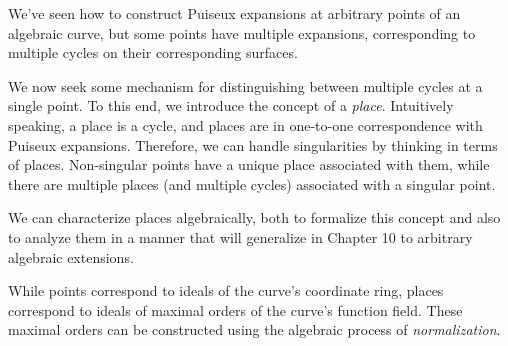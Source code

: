 \begin{comment}
\begin{sageblock}
test_curves = [
    y^3 - 3*y + 2*x,
    y^3 + 3*y - x,
    y^3 - 3*y^2 - x,
    y^4 - 4*y - x,
    y^4+2*(1-2*x)*y^2+1,
    y^3-3*y^2+x^6,
    y^3-3*y+2*x^2*(2-x^2),
    y^3-3*y+2*x^3*(2-x^3),
    3*x*(x-1)*y^4 -4*(x-1)*(x-2)*y^3 + (4/27)*(x-2)^4,
    y^5 + (x^2-1)*y^4 - (4^4)/(5^5)*x^2*(x^2-1),
    y^3 - x*y - x^2,
    y^3 - 3*x^2*y + 2*x,
    y^3 - 3*x*y + 2*x^2,
    y^3 - 3*y + x^6];

# for f in test_curves:
#     analyze_multiple_points(f)
\end{sageblock}


$$y^3 - 3axy + x^3$$

This function contains an extra variable and is, in fact, a family of
algebraic curves.

\endexample

\end{comment}


\vfill\eject
{}

We've seen how to construct Puiseux expansions at arbitrary points of
an algebraic curve, but some points have multiple expansions,
corresponding to multiple cycles on their corresponding surfaces.

We now seek some mechanism for distinguishing between multiple cycles
at a single point.  To this end, we introduce the concept of a {\it
place}.  Intuitively speaking, a place is a cycle, and places are in
one-to-one correspondence with Puiseux expansions.  Therefore, we
can handle singularities by thinking in terms of places.
Non-singular points have a unique place associated
with them, while there are multiple places (and multiple cycles)
associated with a singular point.

We can characterize places algebraically, both to formalize this
concept and also to analyze them in a manner that will generalize
in Chapter 10 to arbitrary algebraic extensions.

While points correspond to ideals of the curve's coordinate ring,
places correspond to ideals of maximal orders of the curve's
function field.  These maximal orders can be constructed
using the algebraic process of {\it normalization}.

